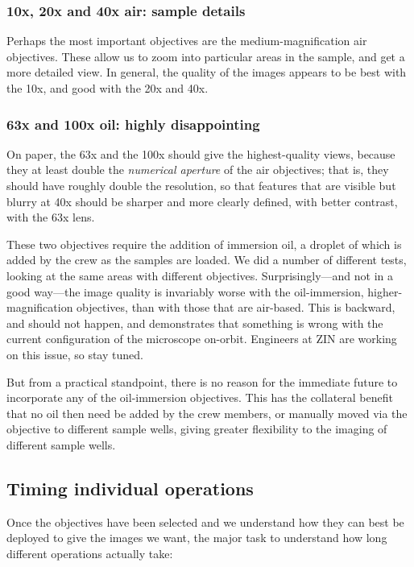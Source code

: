 \subsubsection{10x, 20x and 40x air: sample details}\hypertarget{x-20x-and-40x-air-sample-details}{}\label{x-20x-and-40x-air-sample-details}
Perhaps the most important objectives are the medium-magnification air
objectives. These allow us to zoom into particular areas in the sample, and get
a more detailed view. In general, the quality of the images appears to be best
with the 10x, and good with the 20x and 40x.

\subsubsection{63x and 100x oil: highly disappointing}\hypertarget{x-and-100x-oil-highly-disappointing}{}\label{x-and-100x-oil-highly-disappointing}
On paper, the 63x and the 100x should give the highest-quality views, because
they at least double the \emph{numerical aperture} of the air objectives; that
is, they should have roughly double the resolution, so that features that are
visible but blurry at 40x should be sharper and more clearly defined, with
better contrast, with the 63x lens.

These two objectives require the addition of immersion oil, a droplet of which
is added by the crew as the samples are loaded. We did a number of different
tests, looking at the same areas with different objectives. Surprisingly---and
not in a good way---the image quality is invariably worse with the
oil-immersion, higher-magnification objectives, than with those that are
air-based. This is backward, and should not happen, and demonstrates that
something is wrong with the current configuration of the microscope on-orbit.
Engineers at ZIN are working on this issue, so stay tuned.

But from a practical standpoint, there is no reason for the immediate future to
incorporate any of the oil-immersion objectives. This has the collateral benefit
that no oil then need be added by the crew members, or manually moved via the
objective to different sample wells, giving greater flexibility to the imaging
of different sample wells.

\subsection{Timing individual operations}\hypertarget{timing-individual-operations}{}\label{timing-individual-operations}
Once the objectives have been selected and we understand how they can best be
deployed to give the images we want, the major task to understand how long
different operations actually take:

